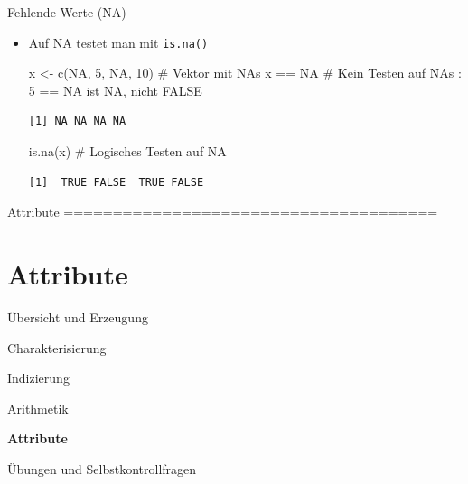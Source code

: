 \documentclass[
  8pt,
  ignorenonframetext,
]{beamer}
\newenvironment{Shaded}{\begin{snugshade}}{\end{snugshade}}
\newcommand{\CommentTok}[1]{\textcolor[rgb]{0.37,0.37,0.37}{#1}}
\newcommand{\ConstantTok}[1]{\textcolor[rgb]{0.56,0.35,0.01}{#1}}
\newcommand{\DecValTok}[1]{\textcolor[rgb]{0.68,0.00,0.00}{#1}}
\newcommand{\FunctionTok}[1]{\textcolor[rgb]{0.28,0.35,0.67}{#1}}
\newcommand{\NormalTok}[1]{\textcolor[rgb]{0.00,0.23,0.31}{#1}}
\newcommand{\OtherTok}[1]{\textcolor[rgb]{0.00,0.23,0.31}{#1}}
\newcommand{\SpecialCharTok}[1]{\textcolor[rgb]{0.37,0.37,0.37}{#1}}
\begin{document}
\begin{frame}[fragile]{Fehlende Werte (NA)}
\protect\hypertarget{fehlende-werte-na-1}{}
\small
{}

\begin{itemize}
\item
  Auf NA testet man mit \texttt{is.na()}

\begin{Shaded}
\begin{Highlighting}[]
\NormalTok{x }\OtherTok{\textless{}{-}} \FunctionTok{c}\NormalTok{(}\ConstantTok{NA}\NormalTok{, }\DecValTok{5}\NormalTok{, }\ConstantTok{NA}\NormalTok{, }\DecValTok{10}\NormalTok{)  }\CommentTok{\# Vektor mit NAs}
\NormalTok{x }\SpecialCharTok{==} \ConstantTok{NA}                \CommentTok{\# Kein Testen auf NAs : 5 == NA ist NA, nicht FALSE}
\end{Highlighting}
\end{Shaded}

\begin{verbatim}
[1] NA NA NA NA
\end{verbatim}

\begin{Shaded}
\begin{Highlighting}[]
\FunctionTok{is.na}\NormalTok{(x)               }\CommentTok{\# Logisches Testen auf NA}
\end{Highlighting}
\end{Shaded}

\begin{verbatim}
[1]  TRUE FALSE  TRUE FALSE
\end{verbatim}
\end{itemize}

\vfill
\end{frame}

\begin{frame}[plain]{Attribute ======================================}
\protect\hypertarget{attribute}{}
\AtBeginSection{}
\section{Attribute}

\large
{}
\vfill

Übersicht und Erzeugung

Charakterisierung

Indizierung

Arithmetik

\textbf{Attribute}

Übungen und Selbstkontrollfragen
\end{frame}
\end{document}
